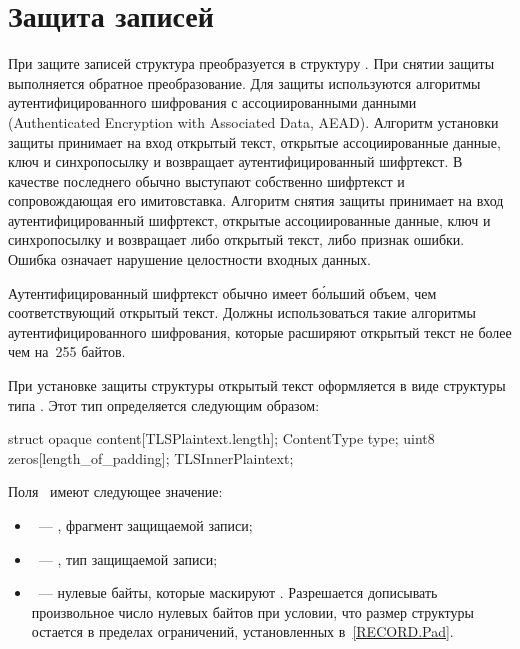 \section{Защита записей}\label{RECORD.Enc}

При защите записей структура  преобразуется 
в структуру . При снятии защиты выполняется обратное 
преобразование.
%
Для защиты используются алгоритмы аутентифицированного шифрования с 
ассоциированными данными (Authenticated Encryption with Associated Data, AEAD).
%
Алгоритм установки защиты принимает на вход открытый текст, открытые 
ассоциированные данные, ключ и синхропосылку и возвращает аутентифицированный 
шифртекст. В качестве последнего обычно выступают собственно шифртекст и 
сопровождающая его имитовставка. 
%
Алгоритм снятия защиты принимает на вход аутентифицированный шифртекст, открытые 
ассоциированные данные, ключ и синхропосылку и возвращает либо открытый текст, 
либо признак ошибки. Ошибка означает нарушение целостности входных данных. 

Аутентифицированный шифртекст обычно имеет б\'{о}льший объем, чем 
соответствующий открытый текст. Должны использоваться такие алгоритмы 
аутентифицированного шифрования, которые расширяют открытый текст не более чем 
на~255 байтов.

При установке защиты структуры  открытый текст оформляется  
в виде структуры типа . Этот тип определяется 
следующим образом:
%
\begin{codeblock}
struct {
  opaque content[TLSPlaintext.length];
  ContentType type;
  uint8 zeros[length_of_padding];
} TLSInnerPlaintext;
\end{codeblock}

Поля~ имеют следующее значение:
\begin{itemize}
\item
{}~--- , фрагмент защищаемой записи;

\item
{}~--- , тип защищаемой записи;

\item
{}~--- нулевые байты, которые маскируют . 
Разрешается дописывать произвольное число нулевых байтов при условии, что 
размер структуры  остается в пределах ограничений,
установленных в~\ref{RECORD.Pad}.
\end{itemize}

